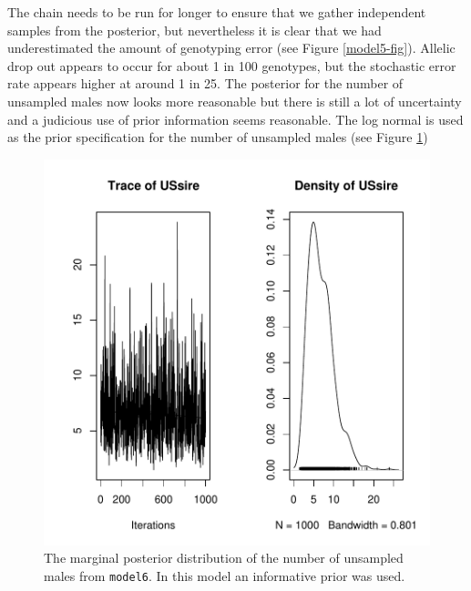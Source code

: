 \documentclass{article}
\begin{document}
The chain needs to be run for longer to ensure that we gather independent samples from the posterior, but nevertheless it is clear that we had underestimated the amount of genotyping error (see Figure \ref{model5-fig}).  Allelic drop out appears to occur for about 1 in 100 genotypes, but the stochastic error rate appears higher at around 1 in 25. The posterior for the number of unsampled males now looks more reasonable but there is still a lot of uncertainty and a judicious use of prior information seems reasonable.  The log normal is used as the prior specification for the number of unsampled males (see Figure \ref{model6US-fig})


\begin{Schunk}
\end{Schunk}


\begin{figure}[!h]
\begin{center}
\includegraphics{Tutorial-040}
\end{center}
\caption{The marginal posterior distribution of the number of unsampled males from \texttt{model6}. In this model an informative prior was used.}
\label{model6US-fig}
\end{figure}
\end{document}
